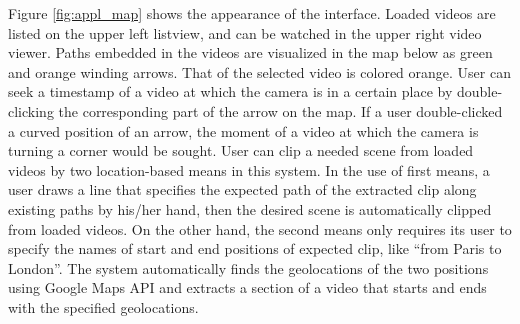 Figure \ref{fig:appl_map} shows the appearance of the interface.
Loaded videos are listed on the upper left listview, and can be watched in the upper right video viewer.
Paths embedded in the videos are visualized in the map below as green and orange winding arrows. That of the selected video is colored orange.
User can seek a timestamp of a video at which the camera is in a certain place by double-clicking the corresponding part of the arrow on the map.
If a user double-clicked a curved position of an arrow, the moment of a video at which the camera is turning a corner would be sought.
User can clip a needed scene from loaded videos by two location-based means in this system.
In the use of first means, a user draws a line that specifies the expected path of the extracted clip along existing paths by his/her hand, then the desired scene is automatically clipped from loaded videos.
On the other hand, the second means only requires its user to specify the names of start and end positions of expected clip, like ``from Paris to London''.
The system automatically finds the geolocations of the two positions using Google Maps API \cite{googlemapsapi} and extracts a section of a video that starts and ends with the specified geolocations.
